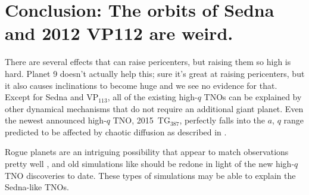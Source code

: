 \documentclass{aastex62}
\begin{document}
\section{Conclusion: The orbits of Sedna and 2012 VP112 are weird.}

There are several effects that can raise pericenters, but raising them so high is hard.
Planet 9 doesn't actually help this; sure it's great at raising pericenters, but it also causes inclinations to become huge and we see no evidence for that.
Except for Sedna and VP$_{113}$, all of the existing high-$q$ TNOs can be explained by other dynamical mechanisms that do not require an additional giant planet.  
Even the newest announced high-$q$ TNO, 2015~TG$_{387}$, perfectly falls into the $a$, $q$ range predicted to be affected by chaotic diffusion as described in \citet{bannister17}.

Rogue planets are an intriguing possibility that appear to match observations pretty well \citep{lawler2018,silsbee18}, and old simulations like \citet{gladmanchan06} should be redone in light of the new high-$q$ TNO discoveries to date.
These types of simulations may be able to explain the Sedna-like TNOs.


% 



\end{document}
